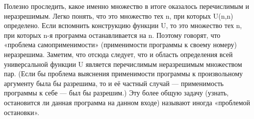 Полезно проследить, какое именно множество в итоге оказалось перечислимым и неразрешимым. Легко понять, что это
множество тех n, при которых U(n,n) определено. Если вспомнить конструкцию функции U, то это множество тех n, при
которых n-я программа останавливается на n. Поэтому говорят, что «проблема самоприменимости» (применимости
программы к своему номеру) неразрешима. Заметим, что отсюда следует, что и область определения всей универсальной
функции U является перечислимым неразрешимым множеством пар. (Если бы проблема выяснения применимости программы к
произвольному аргументу была бы разрешима, то и её частный случай — применимость программы к себе — был бы
разрешим.) Эту более общую задачу (узнать, остановится ли данная программа на данном входе) называют иногда
«проблемой остановки».
